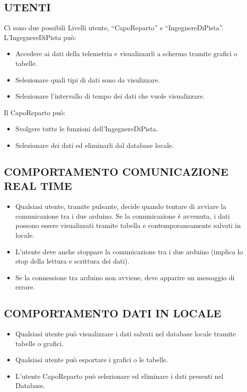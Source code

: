 \documentclass{report}
\begin{document}
\subsection{UTENTI}
Ci sono due possibili Livelli utente, “CapoReparto” e “IngegnereDiPista”.\\

L'IngegnereDiPista può:\\
\begin{itemize}
\item Accedere ai dati della telemetria e visualizzarli a schermo tramite grafici o tabelle.
\item Selezionare quali tipi di dati sono da visulizzare.
\item Selezionare l’intervallo di tempo dei dati che vuole visualizzare.\\
\end{itemize}

Il CapoReparto può:
\begin{itemize}
\item Svolgere tutte le funzioni dell’IngegnereDiPista.
\item Selezionare dei dati ed eliminarli dal database locale.
\end{itemize}

\subsection{COMPORTAMENTO COMUNICAZIONE REAL TIME}
\begin{itemize}
\item Qualsiasi utente, tramite pulsante, decide quando tentare di avviare la comunicazione tra i due arduino.
Se la comunicazione è avvenuta, i dati possono essere visualizzati tramite tabella e contemporaneamente salvati in locale.
\item L’utente deve anche stoppare la comunicazione tra i due arduino (implica lo stop della lettura e scrittura dei dati).
\item Se la connessione tra arduino non avviene, deve apparire un messaggio di errore.
\end{itemize}

\subsection{COMPORTAMENTO DATI IN LOCALE}
\begin{itemize}
\item Qualsiasi utente può visualizzare i dati salvati nel database locale tramite tabelle o grafici.
\item Qualsiasi utente può esportare i grafici o le tabelle.
\item L’utente CapoReparto può selezionare ed eliminare i dati presenti nel Database.
\end{itemize}
\end{document}
